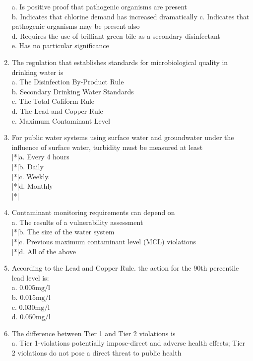 \begin{enumerate}
a. Is positive proof that pathogenic organisms are present\\
b. Indicates that chlorine demand has increased dramatically c. Indicates that pathogenic organisms may be present also\\
d. Requires the use of brilliant green bile as a secondary disinfectant\\
e. Has no particular significance\\
\item The regulation that establishes standards for microbiological quality in drinking water is\\
a. The Disinfection By-Product Rule\\
b. Secondary Drinking Water Standards\\
c. The Total Coliform Rule\\
d. The Lead and Copper Rule\\
e. Maximum Contaminant Level\\
\item For public water systems using surface water and groundwater under the influence of surface water, turbidity must be measured at least\\
|*|a. Every 4 hours\\
|*|b. Daily\\
|*|c. Weekly.\\
|*|d. Monthly\\
|*|\item Contaminant monitoring requirements can depend on\\
a. The results of a vulnerability assessment\\
|*|b. The size of the water system\\
|*|c. Previous maximum contaminant level (MCL) violations\\
|*|d. All of the above\\
\item According to the Lead and Copper Rule. the action for the 90th percentile lead level is:\\
a. $0.005 \mathrm{mg} / \mathrm{l}$\\
b. $0.015 \mathrm{mg} / \mathrm{l}$\\
c. $0.030 \mathrm{mg} / \mathrm{l}$\\
d. $0.050 \mathrm{mg} / \mathrm{l}$\\
\item The difference between Tier 1 and Tier 2 violations is\\
a. Tier 1-violations potentially impose-direct and adverse health effects; Tier 2 violations do not pose a direct threat to public health\\

\end{enumerate}

